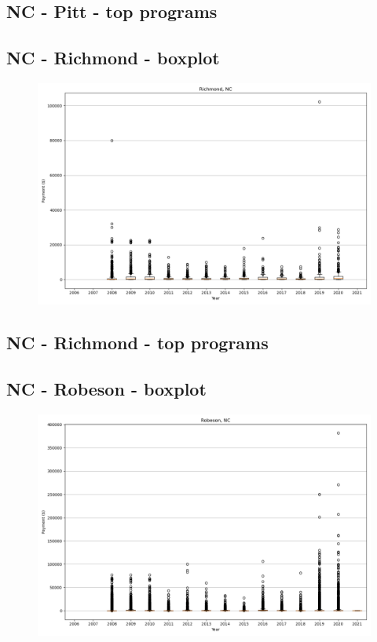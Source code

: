 \subsection*{NC - Pitt - top programs}

\newpage
\subsection*{NC - Richmond - boxplot}
\begin{figure}[h]
\centering
\includegraphics[width=7in]{../output/boxplots/counties/Richmond-NC_boxplot.png}
\end{figure}


\subsection*{NC - Richmond - top programs}

\newpage
\subsection*{NC - Robeson - boxplot}
\begin{figure}[h]
\centering
\includegraphics[width=7in]{../output/boxplots/counties/Robeson-NC_boxplot.png}
\end{figure}


